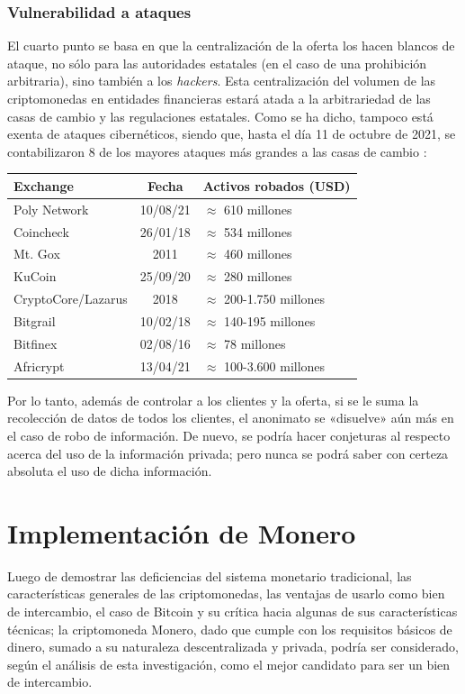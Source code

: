 \documentclass[12pt,a4paper,twoside]{book}
\begin{document}
\subsection{Vulnerabilidad a ataques}
El cuarto punto se basa en que la centralización de la oferta los hacen blancos de ataque, no sólo para las autoridades estatales (en el caso de una prohibición arbitraria), sino también a los \textit{hackers}. Esta centralización del volumen de las criptomonedas en entidades financieras estará atada a la arbitrariedad de las casas de cambio y las regulaciones estatales. Como se ha dicho, tampoco está exenta de ataques cibernéticos, siendo que, hasta el día 11 de octubre de 2021, se contabilizaron 8 de los mayores ataques más grandes a las casas de cambio \cite{exchanges:hacks}:

\begin{center}
\begin{tabular}{|l|c|l|}
\hline 
\textbf{Exchange} & \textbf{Fecha} & \textbf{Activos robados (USD)} \\
\hline
Poly Network  & 10/08/21 & $ \approx $ 610 millones \\
\hline
Coincheck & 26/01/18 & $ \approx $ 534 millones \\
\hline
Mt. Gox & 2011 & $ \approx $ 460 millones \\
\hline
KuCoin & 25/09/20 & $ \approx $ 280 millones \\
\hline
CryptoCore/Lazarus & 2018 & $ \approx $ 200-1.750 millones \\
\hline
Bitgrail & 10/02/18 & $ \approx $ 140-195 millones \\
\hline
Bitfinex & 02/08/16 & $ \approx $ 78 millones \\
\hline
Africrypt & 13/04/21 & $ \approx $ 100-3.600 millones \\
\hline
\end{tabular} 
\end{center}

Por lo tanto, además de controlar a los clientes y la oferta, si se le suma la recolección de datos de todos los clientes, el anonimato se «disuelve» aún más en el caso de robo de información. De nuevo, se podría hacer conjeturas al respecto acerca del uso de la información privada; pero nunca se podrá saber con certeza absoluta el uso de dicha información.

\chapter{Implementación de Monero}
Luego de demostrar las deficiencias del sistema monetario tradicional, las características generales de las criptomonedas, las ventajas de usarlo como bien de intercambio, el caso de Bitcoin y su crítica hacia algunas de sus características técnicas; la criptomoneda Monero, dado que cumple con los requisitos básicos de dinero, sumado a su naturaleza descentralizada y privada, podría ser considerado, según el análisis de esta investigación, como el mejor candidato para ser un bien de intercambio.
\end{document}
